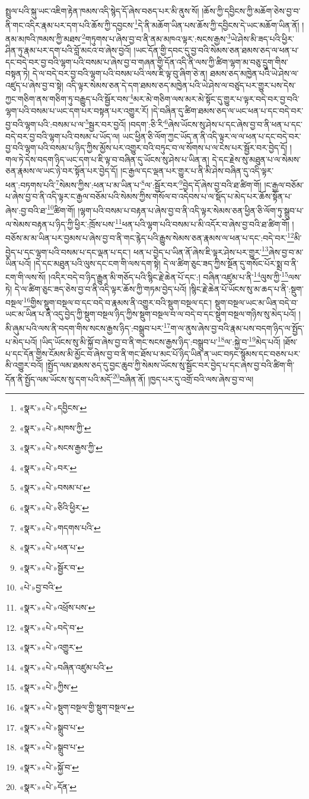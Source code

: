སྤྲུལ་པའི་སྐུ་ཡང་འཇིག་རྟེན་ཁམས་འདི་སྙེད་དོ་ཞེས་བཅད་པར་མི་ནུས་སོ། །ཆོས་ཀྱི་དབྱིངས་ཀྱི་མཆོག་ཅེས་བྱ་བ་ནི་གང་འདིར་རྣམ་པར་དག་པའི་ཆོས་ཀྱི་དབྱངས་\footnote{«སྣར་»«པེ་»དབྱིངས་}དེ་ནི་མཆོག་ཡིན་པས་ཆོས་ཀྱི་དབྱིངས་དེ་ཡང་མཆོག་ཡིན་ནོ། །ནམ་མཁའི་ཁམས་ཀྱི་མཐས་\footnote{«སྣར་»«པེ་»མཁས་ཀྱི་}གཏུགས་པ་ཞེས་བྱ་བ་ནི་ནམ་མཁའ་ལྟར་:སངས་རྒྱས་\footnote{«སྣར་»«པེ་»སངས་རྒྱས་ཀྱི་}ཡེ་ཤེས་མི་ཟད་པའི་ཕྱིར་ཤིན་ཏུ་རྣམ་པར་དག་པའི་བློ་མངའ་བ་ཞེས་བྱའོ། །ཡང་དོན་གྱི་དབང་དུ་བྱ་བའི་སེམས་ཅན་ཐམས་ཅད་ལ་ཕན་པ་དང་བདེ་བར་བྱ་བའི་ལྷག་པའི་བསམ་པ་ཞེས་བྱ་བ་གཞན་གྱི་དོན་འདི་ནི་ལས་ཀྱི་ཚིག་ལྷག་མ་བཅུ་དྲུག་གིས་བསྟན་ཏེ། དེ་ལ་བདེ་བར་བྱ་བའི་ལྷག་པའི་བསམ་པའི་ལས་ཇི་ལྟ་བུ་ཞིག་ཅེ་ན། ཐམས་ཅད་མཁྱེན་པའི་ཡེ་ཤེས་ལ་འཛུད་པ་ཞེས་བྱ་བ་སྟེ། འདི་ལྟར་སེམས་ཅན་དེ་དག་ཐམས་ཅད་མཁྱེན་པའི་ཡེ་ཤེས་ལ་བཙུད་པར་གྱུར་པས་དེས་ཀྱང་གཅིག་ནས་གཅིག་ཏུ་བརྒྱུད་པའི་སྦྱོར་བས་\footnote{«སྣར་»«པེ་»བར་}མར་མེ་གཅིག་ལས་མར་མེ་སྟོང་དུ་གྱུར་པ་ལྟར་བདེ་བར་བྱ་བའི་ལྷག་པའི་བསམ་པ་ཡང་དག་པར་བསྟན་པར་འགྱུར་རོ། །དེ་བཞིན་དུ་ཚིག་ཐམས་ཅད་ལ་ཡང་ཕན་པ་དང་བདེ་བར་བྱ་བའི་ལྷག་པའི་:བསམ་པ་ལ་\footnote{«སྣར་»«པེ་»བསམ་པ་}སྦྱར་བར་བྱའོ། །བདག་:ཅི་རི་\footnote{«སྣར་»«པེ་»ཅིའི་ཕྱིར་}ཞེས་ཡོངས་སུ་ཤེས་པ་དང་ཞེས་བྱ་བ་ནི་ཕན་པ་དང་བདེ་བར་བྱ་བའི་ལྷག་པའི་བསམ་པ་ཡོད་ལ། ཡང་ཕྱིན་ཅི་ལོག་ཀྱང་ཡོད་ན་ནི་འདི་ལྟར་ལ་ལ་ཕན་པ་དང་བདེ་བར་བྱ་བའི་ལྷག་པའི་བསམ་པ་ཉིད་ཀྱིས་མྱོས་པར་འགྱུར་བའི་བཏུང་བ་ལ་སོགས་པ་ལ་ངེས་པར་སྦྱོར་བར་བྱེད་དོ། །གལ་ཏེ་དེས་བདག་ཉིད་ཡང་དག་པ་ཇི་ལྟ་བ་བཞིན་དུ་ཡོངས་སུ་ཤེས་པ་ཡིན་ན། དེ་དང་རྗེས་སུ་མཐུན་པ་ལ་སེམས་ཅན་རྣམས་ལ་ཡང་ཉེ་བར་སྟོན་པར་བྱེད་དོ། །ང་རྒྱལ་དང་ལྡན་པར་གྱུར་པ་ནི་མི་ཤེས་བཞིན་དུ་འདི་ལྟར་ཕན་:བཏགས་པའི་\footnote{«སྣར་»«པེ་»གདགས་པའི་}སེམས་ཀྱིས་:ཕན་པ་མ་ཡིན་པ་\footnote{«སྣར་»«པེ་»ཕན་པ་}ལ་:སྦྱོར་བར་\footnote{«སྣར་»«པེ་»སྦྱོར་བ་}བྱེད་དོ་ཞེས་བྱ་བའི་ཐ་ཚིག་གོ། །ང་རྒྱལ་བཅོམ་པ་ཞེས་བྱ་བ་ནི་འདི་ལྟར་ང་རྒྱལ་བཅོམ་པའི་སེམས་ཀྱིས་གསོལ་བ་འདེབས་པ་ལ་སྡོད་པ་མེད་པར་ཆོས་སྟོན་པ་ཞེས་:བྱ་བའི་ཐ་\footnote{«པེ་»བྱ་བའི་}ཚིག་གོ། །ལྷག་པའི་བསམ་པ་བརྟན་པ་ཞེས་བྱ་བ་ནི་འདི་ལྟར་སེམས་ཅན་ཕྱིན་ཅི་ལོག་ཏུ་སྒྲུབ་པ་ལ་སེམས་བརྟན་པ་ཉིད་ཀྱི་ཕྱིར་:ཁྲོས་པས་\footnote{«སྣར་»«པེ་»འཕྲོས་པས་}ཕན་པའི་ལྷག་པའི་བསམ་པ་མི་འདོར་བ་ཞེས་བྱ་བའི་ཐ་ཚིག་གོ། །བཅོས་མ་མ་ཡིན་པར་བྱམས་པ་ཞེས་བྱ་བ་ནི་གང་རྙེད་པའི་རྒྱུས་སེམས་ཅན་རྣམས་ལ་ཕན་པ་དང་:བདེ་བར་\footnote{«སྣར་»«པེ་»བདེ་བ་}མི་བྱེད་པ་དང་ལྷག་པའི་བསམ་པ་དང་ལྡན་པ་དང་། ཕན་པ་བྱེད་པ་ཡིན་ནོ་ཞེས་ཇི་ལྟར་ཤེས་པར་གྱུར་\footnote{«སྣར་»«པེ་»འགྱུར་}ཞེས་བྱ་བ་མ་ཡིན་པའོ། །དེ་དང་མཐུན་པའི་ལུས་དང་ངག་གི་ལས་དག་སྟེ། དེ་ལ་ཚིག་ཅུང་ཟད་ཀྱིས་སྔོན་དུ་གསོང་པོར་སྨྲ་བ་ནི་ངག་གི་ལས་སོ། །འདིར་བདེ་བ་ཉིད་རྒྱུན་མི་གཅོད་པའི་སྙིང་རྗེ་ཆེན་པོ་དང་:། བཞིན་འཛུམ་པ་ནི་\footnote{«སྣར་»«པེ་»བཞིན་འཛུམ་པའི་}ལུས་ཀྱི་\footnote{«སྣར་»«པེ་»ཀྱིས་}ལས་ཏེ། དེ་ལ་ཚིག་ཅུང་ཟད་ཅེས་བྱ་བ་ནི་འདི་ལྟར་ཆོས་ཀྱི་གཏམ་བྱེད་པའོ། །སྙིང་རྗེ་ཆེན་པོ་ཡོངས་སུ་མ་ཆད་པ་ནི་:སྡུག་བསྔལ་\footnote{«སྣར་»«པེ་»སྡུག་བསྔལ་གྱི་སྡུག་བསྔལ་}གྱིས་སྡུག་བསྔལ་བ་དང་བདེ་བ་རྣམས་ནི་འགྱུར་བའི་སྡུག་བསྔལ་དང་། སྡུག་བསྔལ་ཡང་མ་ཡིན་བདེ་བ་ཡང་མ་ཡིན་པ་ནི་འདུ་བྱེད་ཀྱི་སྡུག་བསྔལ་ཉིད་ཀྱིས་སྡུག་བསྔལ་བ་ལ་བདེ་བ་དང་སྡུག་བསྔལ་གཉིས་སུ་མེད་པའོ། །མི་ཞུམ་པའི་ལས་ནི་བདག་གིས་སངས་རྒྱས་ཉིད་:བསྒྲུབ་པར་\footnote{«སྣར་»«པེ་»སྒྲུབ་པ་}ག་ལ་ནུས་ཞེས་བྱ་བའི་རྣམ་པས་བདག་ཉིད་ལ་སྤྱོད་པ་མེད་པའོ། །ཡིད་ཡོངས་སུ་མི་སྐྱོ་བ་ཞེས་བྱ་བ་ནི་གང་སངས་རྒྱས་ཉིད་:བསྒྲུབ་པ་\footnote{«སྣར་»«པེ་»སྒྲུབ་པ་}ལ་:སྐྱེ་བ་\footnote{«སྣར་»«པེ་»སྐྱོ་བ་}མེད་པའོ། །ཐོས་པ་དང་དོན་གྱིས་ངོམས་མི་མྱོང་བ་ཞེས་བྱ་བ་ནི་གང་ཐོས་པ་མང་པོ་ཉིད་ཡིན་ན་ཡང་བཏང་སྙོམས་དང་བཅས་པར་མི་འགྱུར་བའོ། །སྤྱོད་ལམ་ཐམས་ཅད་དུ་བྱང་ཆུབ་ཀྱི་སེམས་ཡོངས་སུ་སྦྱོང་བར་བྱེད་པ་དང་ཞེས་བྱ་བའི་ཚིག་གི་དོན་ནི་སྤྱོད་ལམ་ཡོངས་སུ་དག་པའི་མདོ་\footnote{«སྣར་»«པེ་»དོན་}བཞིན་ནོ། །ཁྱད་པར་དུ་འགྲོ་བའི་ལས་ཞེས་བྱ་བ་ལ། 